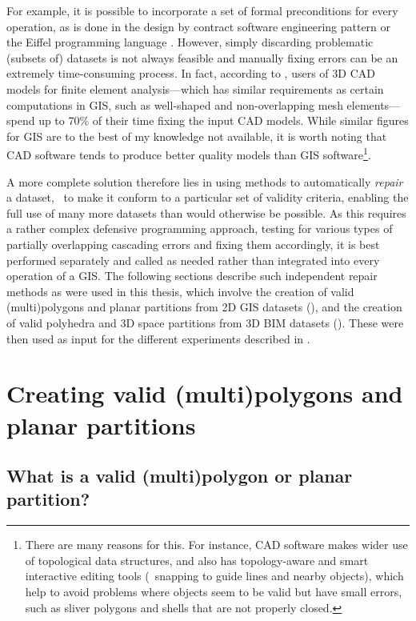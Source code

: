 For example, it is possible to incorporate a set of formal preconditions for every operation, as is done in the design by contract software engineering pattern \citep{Meyer86} or the Eiffel programming language \citep{ISO/IEC25436:2007}.
However, simply discarding problematic (subsets of) datasets is not always feasible and manually fixing errors can be an extremely time-consuming process.
In fact, according to \citet{McKenney98}, users of 3D CAD models for finite element analysis---which has similar requirements as certain computations in GIS, such as well-shaped and non-overlapping mesh elements---spend up to 70\% of their time fixing the input CAD models.
While similar figures for GIS are to the best of my knowledge not available, it is worth noting that CAD software tends to produce better quality models than GIS software\footnote{There are many reasons for this. For instance, CAD software makes wider use of topological data structures, and also has topology-aware and smart interactive editing tools (\eg\ snapping to guide lines and nearby objects), which help to avoid problems where objects seem to be valid but have small errors, such as sliver polygons and shells that are not properly closed.}.

A more complete solution therefore lies in using methods to automatically \emph{repair} a dataset, \ie\ to make it conform to a particular set of validity criteria, enabling the full use of many more datasets than would otherwise be possible.
As this requires a rather complex defensive programming approach, testing for various types of partially overlapping cascading errors and fixing them accordingly, it is best performed separately and called as needed rather than integrated into every operation of a GIS.\@
The following sections describe such independent repair methods as were used in this thesis, which involve the creation of valid (multi)polygons and planar partitions from 2D GIS datasets (), and the creation of valid polyhedra and 3D space partitions from 3D BIM datasets ().
These were then used as input for the different experiments described in .

\section{Creating valid (multi)polygons and planar partitions}
\label{se:pprepair}

\subsection{What is a valid (multi)polygon or planar partition?}

